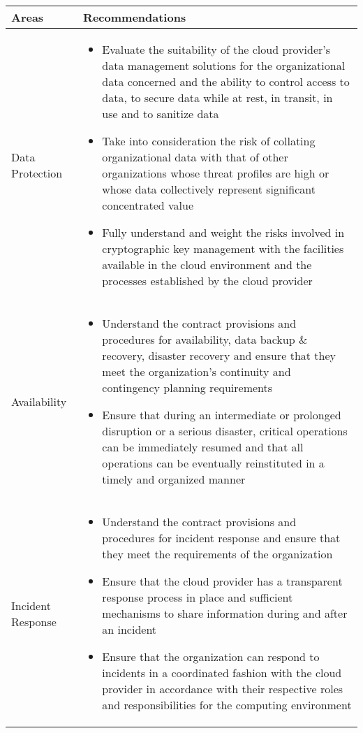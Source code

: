 \begin{center}
    \begin{tabular}{p{3cm} | p{12cm}}
        \bfseries{Areas} & \bfseries{Recommendations}\\ \hline
        Data Protection &
        \begin{itemize}
            \item Evaluate the suitability of the cloud provider's data management solutions for the organizational data concerned and the ability to control access to data, to secure data while at rest, in transit, in use and to sanitize data
            \item Take into consideration the risk of collating organizational data with that of other organizations whose threat profiles are high or whose data collectively represent significant concentrated value
            \item Fully understand and weight the risks involved in cryptographic key management with the facilities available in the cloud environment and the processes established by the cloud provider
        \end{itemize}\\
        Availability &
        \begin{itemize}
            \item Understand the contract provisions and procedures for availability, data backup \& recovery, disaster recovery and ensure that they meet the organization's continuity and contingency planning requirements
            \item Ensure that during an intermediate or prolonged disruption or a serious disaster, critical operations can be immediately resumed and that all operations can be eventually reinstituted in a timely and organized manner
        \end{itemize}\\
        Incident Response &
        \begin{itemize}
            \item Understand the contract provisions and procedures for incident response and ensure that they meet the requirements of the organization
            \item Ensure that the cloud provider has a transparent response process in place and sufficient mechanisms to share information during and after an incident
            \item Ensure that the organization can respond to incidents in a coordinated fashion with the cloud provider in accordance with their respective roles and responsibilities for the computing environment
        \end{itemize}
    \end{tabular}
\end{center}

